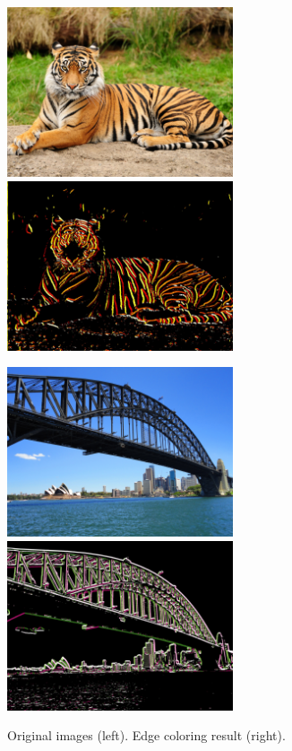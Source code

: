 \documentclass{article}
\begin{document}
\begin{figure}[t]
\centering
\includegraphics[height=5cm]{images/orig_2.jpg}
\hspace{0.1cm}
\includegraphics[height=5cm]{images/edge_color_2.jpg}

\vspace{0.5cm}
\includegraphics[height=5cm]{images/orig_3.jpg}
\hspace{0.1cm}
\includegraphics[height=5cm]{images/edge_color_3.jpg}

\caption{Original images (left). Edge coloring result (right).}
\end{figure}
\end{document}
